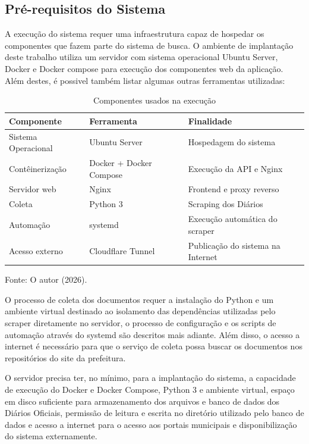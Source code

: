 \subsection{Pré-requisitos do Sistema}

A execução do sistema requer uma infraestrutura capaz de hospedar os componentes que fazem parte do sistema de busca. O ambiente de implantação deste trabalho utiliza um servidor com sistema operacional Ubuntu Server, Docker e Docker compose para execução dos componentes web da aplicação. Além destes, é possivel também listar algumas outras ferramentas utilizadas:

\begin{table}[h]
    \centering
    \caption{Componentes usados na execução}
    \label{tab:tabela_componentes_usados_na_execucao}
    \begin{tabularx}{\textwidth}{l l X}
        \toprule
        Componente & Ferramenta & Finalidade \\
        \midrule
        Sistema Operacional & Ubuntu Server & Hospedagem do sistema\\ 
        Contêinerização & Docker + Docker Compose & Execução da API e Nginx\\
        Servidor web & Nginx & Frontend e proxy reverso \\ 
        Coleta & Python 3 & Scraping dos Diários\\ 
        Automação & systemd & Execução automática do scraper \\
        Acesso externo & Cloudflare Tunnel & Publicação do sistema na Internet \\
        \bottomrule
    \end{tabularx}
\end{table}{\footnotesize Fonte: O autor (2026).}

O processo de coleta dos documentos requer a instalação do Python e um ambiente virtual destinado ao isolamento das dependências utilizadas pelo scraper diretamente no servidor, o processo de configuração e os scripts de automação através do systemd são descritos mais adiante. Além disso, o acesso a internet é necessário para que o serviço de coleta possa buscar os documentos nos repositórios do site da prefeitura.

O servidor precisa ter, no mínimo, para a implantação do sistema, a capacidade de execução do Docker e Docker Compose, Python 3 e ambiente virtual, espaço em disco suficiente para armazenamento dos arquivos e banco de dados dos Diários Oficiais, permissão de leitura e escrita no diretório utilizado pelo banco de dados e acesso a internet para o acesso aos portais municipais e disponibilização do sistema externamente.

